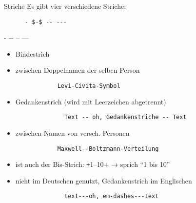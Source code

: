 \begin{frame}[fragile]{Striche}
  Es gibt vier verschiedene Striche:
  \begin{CodeExample}{0.49}
    \begin{verbatim}
      - $-$ -- ---
    \end{verbatim}
  \CodeResult
    \strut
    - $-$ -- ---
  \end{CodeExample}

  \begin{description}
    \item[- Bindestrich]
      \begin{itemize}
        \item Bindestrich
        \item zwischen Doppelnamen der selben Person
          \begin{verbatim}
            Levi-Civita-Symbol
          \end{verbatim}
      \end{itemize}
      \smallskip
    \item[-- Halbgeviertstrich (en-dash)]
      \begin{itemize}
        \item Gedankenstrich (wird mit Leerzeichen abgetrennt)
          \begin{verbatim}
              Text -- oh, Gedankenstriche -- Text
          \end{verbatim}
        \item zwischen Namen von versch. Personen
          \begin{verbatim}
            Maxwell--Boltzmann-Verteilung
          \end{verbatim}
        \item ist auch der Bis-Strich:
          \texttt+1--10+ → sprich \enquote{1 bis 10}
      \end{itemize}
      \smallskip
    \item[--- Geviertstrich (em-dash)]
      \begin{itemize}
          \item nicht im Deutschen genutzt, Gedankenstrich im Englischen
            \begin{verbatim}
              text---oh, em-dashes---text
            \end{verbatim}
      \end{itemize}
  \end{description}
\end{frame}

